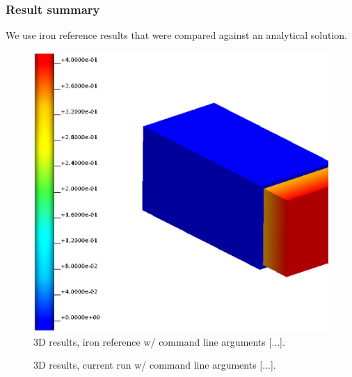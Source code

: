 \subsubsection{Result summary}
%
We use iron reference results that were compared against an analytical solution.
%


%
\begin{figure}[h!]
    \centering 
    \includegraphics[width=0.9\columnwidth]{examples/example-0201-u/doc/figures/iron_reference_3D.eps} 
    \caption{3D results, iron reference w/ command line arguments [...].}
    \label{example-0201-u-iron-3D-reference-fig}
\end{figure}
%
\begin{figure}[h!]
    \centering 
    \caption{3D results, current run w/ command line arguments [...].}
    \label{example-0201-u-current-run-3D-fig}
\end{figure}
%
